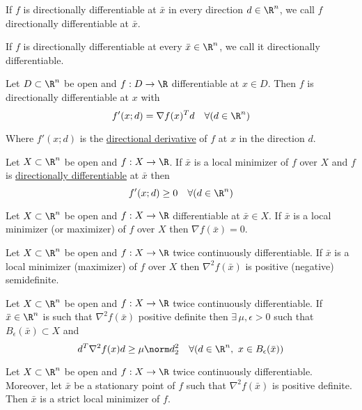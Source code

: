 If $f$ is directionally differentiable at $\bar x$ in every direction
$d\in\R^n$, we call $f$ directionally differentiable at $\bar x$.

If $f$ is directionally differentiable at every $\bar x\in\R^n$, we
call it directionally differentiable.

\label{ed67d29}

Let $D\subset \R^n$ be open and $f:D\to\R$
differentiable at $x\in D$. Then $f$ is directionally differentiable
at $x$ with
$$
	f'(x;d)=\nabla f(x)^Td\quad\forall(d\in\R^n)
$$

Where $f'(x;d)$ is the \hyperref[37eb747]{directional derivative} of
$f$ at $x$ in the direction $d$.

\label{b3b5e10}

Let $X\subset\R^n$ be open and $f:X\to\R$. If $\bar x$ is a local
minimizer of $f$ over $X$ and $f$ is \hyperref[37eb747]{directionally
	differentiable} at $\bar x$ then
$$
	f'(x;d)\geq 0\quad\forall(d\in\R^n)
$$

\label{dc165c9}

Let $X\subset\R^n$ be open and $f:X\to\R$ differentiable at $\bar x\in
	X$. If $\bar x$ is a local minimizer (or maximizer) of $f$ over $X$
then $\nabla f(\bar x)=0$.

\label{ce5370d}

Let $X\subset\R^n$ be open and $f:X\to\R$ twice continuously
differentiable. If $\bar x$ is a local minimizer (maximizer) of $f$
over $X$ then $\nabla^2f(\bar x)$ is positive (negative) semidefinite.

\label{eaa0d24}

Let $X\subset\R^n$ be open and $f:X\to\R$ twice continuously
differentiable. If $\bar x\in\R^n$ is such that $\nabla^2f(\bar x)$
positive definite then $\exists\,\mu,\epsilon>0$ such that
$B_\epsilon(\bar x)\subset X$ and
$$
	d^T\nabla^2f(x)d\geq\mu\norm d^2_2\quad\forall(d\in\R^n,\
	x\in B_\epsilon(\bar x))
$$

\label{b43d95d}

Let $X\subset\R^n$ be open and $f:X\to\R$ twice continuously
differentiable. Moreover, let $\bar x$ be a stationary point of $f$
such that $\nabla^2f(\bar x)$ is positive definite. Then $\bar x$ is a
strict local minimizer of $f$.

\label{ae4eac6}

